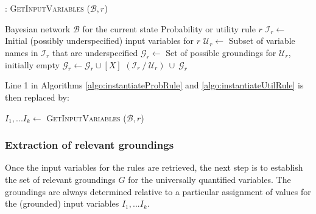 \begin{algorithm}[h!]
\caption{: \textsc{GetInputVariables} ($\mathcal{B}, \mathit{r}$)}
\begin{algorithmic}[1] \vspace{1mm}
\REQUIRE Bayesian network $\mathcal{B}$ for the current state
\REQUIRE Probability or utility rule $\mathit{r}$ \vspace{1mm}
\STATE $\mathcal{I}_{r} \leftarrow $ Initial (possibly underspecified) input variables for $\mathit{r}$
\STATE $\mathcal{U}_{r} \leftarrow $ Subset of variable names in $\mathcal{I}_{r}$ that are underspecified
\STATE $\mathcal{G}_{r} \leftarrow$ Set of possible groundings for $\mathcal{U}_{r}$, initially empty
\STATE $\mathcal{G}_{r} \leftarrow \mathcal{G}_{r} \cup [X]$
\ENDIF
\ENDFOR
\ENDFOR
\RETURN $(\mathcal{I}_{r} \ / \ \mathcal{U}_{r}) \ \cup \  \mathcal{G}_{r}$
\end{algorithmic}
\label{algo:getinputvariables}
\end{algorithm}

 Line 1 in Algorithms \ref{algo:instantiateProbRule} and \ref{algo:instantiateUtilRule} is then replaced by: 
\begin{algorithmic}[1] \vspace{1mm}
\STATE $I_1,...I_k \leftarrow $ \textsc{GetInputVariables} ($\mathcal{B}, \mathit{r}$)
\end{algorithmic}



\subsubsection*{Extraction of relevant groundings}

Once the input variables for the rules are retrieved, the next step is to establish the set of relevant groundings $G$ for the universally quantified variables.  The groundings are always determined relative to a particular assignment of values for the (grounded) input variables $I_1,...I_k$.

